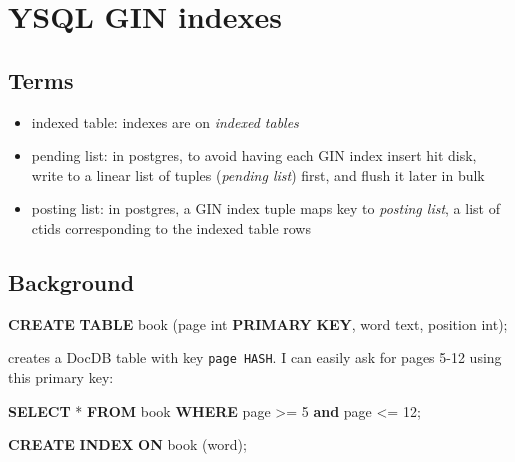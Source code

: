 \documentclass[
]{article}
\author{}
\date{}
\newenvironment{Shaded}{}{}
\newcommand{\DataTypeTok}[1]{\textcolor[rgb]{0.56,0.13,0.00}{#1}}
\newcommand{\DecValTok}[1]{\textcolor[rgb]{0.25,0.63,0.44}{#1}}
\newcommand{\KeywordTok}[1]{\textcolor[rgb]{0.00,0.44,0.13}{\textbf{#1}}}
\newcommand{\NormalTok}[1]{#1}
\newcommand{\OperatorTok}[1]{\textcolor[rgb]{0.40,0.40,0.40}{#1}}
\providecommand{\tightlist}{%
  \setlength{\itemsep}{0pt}\setlength{\parskip}{0pt}}
\begin{document}
\hypertarget{ysql-gin-indexes}{%
\section{YSQL GIN indexes}\label{ysql-gin-indexes}}

\hypertarget{terms}{%
\subsection{Terms}\label{terms}}

\begin{itemize}
\tightlist
\item
  indexed table: indexes are on \emph{indexed tables}
\item
  pending list: in postgres, to avoid having each GIN index insert hit
  disk, write to a linear list of tuples (\emph{pending list}) first,
  and flush it later in bulk
\item
  posting list: in postgres, a GIN index tuple maps key to \emph{posting
  list}, a list of ctids corresponding to the indexed table rows
\end{itemize}

\hypertarget{background}{%
\subsection{Background}\label{background}}

\begin{Shaded}
\begin{Highlighting}[]
\KeywordTok{CREATE} \KeywordTok{TABLE}\NormalTok{ book (page }\DataTypeTok{int} \KeywordTok{PRIMARY} \KeywordTok{KEY}\NormalTok{, word text, position }\DataTypeTok{int}\NormalTok{);}
\end{Highlighting}
\end{Shaded}

creates a DocDB table with key \texttt{page\ HASH}. I can easily ask for
pages 5-12 using this primary key:

\begin{Shaded}
\begin{Highlighting}[]
\KeywordTok{SELECT} \OperatorTok{*} \KeywordTok{FROM}\NormalTok{ book }\KeywordTok{WHERE}\NormalTok{ page }\OperatorTok{\textgreater{}=} \DecValTok{5} \KeywordTok{and}\NormalTok{ page }\OperatorTok{\textless{}=} \DecValTok{12}\NormalTok{;}
\end{Highlighting}
\end{Shaded}

\begin{Shaded}
\begin{Highlighting}[]
\KeywordTok{CREATE} \KeywordTok{INDEX} \KeywordTok{ON}\NormalTok{ book (word);}
\end{Highlighting}
\end{Shaded}
\end{document}
